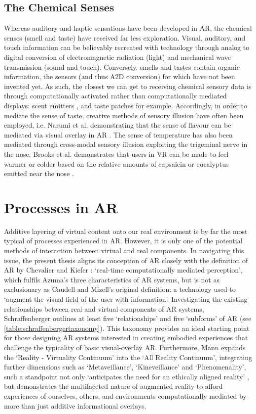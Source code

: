 \subsection{The Chemical Senses}\label{sec: ar-sensory-chemical}
Whereas auditory and haptic sensations have been developed in AR, the chemical senses (smell and taste) have received far less exploration. Visual, auditory, and touch information can be believably recreated with technology through analog to digital conversion of electromagnetic radiation (light) and mechanical wave transmission (sound and touch). Conversely, smells and tastes contain organic information, the sensors (and thus A2D conversion) for which have not been invented yet. As such, the closest we can get to receiving chemical sensory data is through computationally activated rather than computationally mediated displays: scent emitters \citep{maggioni2019}, and taste patches for example. Accordingly, in order to mediate the sense of taste, creative methods of sensory illusion have often been employed, i.e. Narumi et al. demonstrating that the sense of flavour can be mediated via visual overlay in AR \citep{narumi2011}. The sense of temperature has also been mediated through cross-modal sensory illusion exploiting the trigeminal nerve in the nose, Brooks et al. demonstrates that users in VR can be made to feel warmer or colder based on the relative amounts of capsaicin or eucalyptus emitted near the nose \citeyearpar{brooks2020}.
\section{Processes in AR}\label{sec: ar-process}
Additive layering of virtual content onto our real environment is by far the most typical of processes experienced in AR. However, it is only one of the potential methods of interaction between virtual and real components. In navigating this issue, the present thesis aligns its conception of AR closely with the definition of AR by Chevalier and Kiefer \citeyearpar{chevalier2020}: `real-time computationally mediated perception', which fulfils Azuma's three characteristics of AR systems, but is not as exclusionary as Caudell and Mizell's original definition: a technology used to  `augment the visual field of the user with information'. Investigating the existing relationships between real and virtual components of AR systems, Schraffenberger outlines at least five `relationships' and five `subforms' of AR (see \autoref{table:schraffenbergertaxonomy}). This taxonomy \citeyearpar[pp. 80-130]{schraffenberger2018} provides an ideal starting point for those designing AR systems interested in creating embodied experiences that challenge the typicality of basic visual-overlay AR. Furthermore, Mann expands the `Reality - Virtuality Continuum' \citep{milgram1994} into the `All Reality Continuum', integrating further dimensions such as `Metaveillance', `Kineveillance' and `Phenomenality', such a standpoint not only `anticipates the need for an ethically aligned reality' \citeyearpar{mann2018}, but demonstrates the multifaceted nature of augmented reality to afford experiences of ourselves, others, and environments computationally mediated by more than just additive informational overlays.

